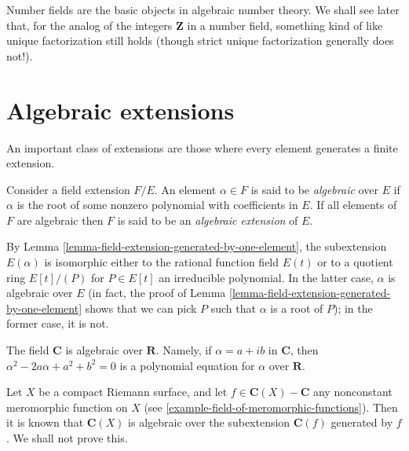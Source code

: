 \noindent
Number fields are the basic objects in algebraic number theory. We shall see
later that,
for the analog of the integers $\mathbf{Z}$ in a number field, something kind
of like unique factorization still holds (though strict unique factorization
generally does not!).


\section{Algebraic extensions}
\label{section-algebraic-extensions}

\noindent
An important class of extensions are those where every element generates
a finite extension.

\begin{definition}
\label{definition-algebraic}
Consider a field extension $F/E$. An element $\alpha \in F$ is said to be
{\it algebraic} over $E$ if $\alpha$ is the root of some nonzero polynomial
with coefficients in $E$. If all elements of $F$ are algebraic then $F$ is
said to be an {\it algebraic extension} of $E$.
\end{definition}

\noindent
By Lemma \ref{lemma-field-extension-generated-by-one-element}, the
subextension $E(\alpha)$ is isomorphic either to the rational function
field $E(t)$ or to a quotient ring $E[t]/(P)$ for $P \in E[t]$ an
irreducible polynomial. In the latter case, $\alpha$ is algebraic over
$E$ (in fact, the proof of
Lemma \ref{lemma-field-extension-generated-by-one-element}
shows that we can pick $P$ such that $\alpha$ is a root of $P$);
in the former case, it is not.

\begin{example}
\label{example-C-algebraic-over-R}
The field $\mathbf{C}$ is algebraic over $\mathbf{R}$. Namely, if
$\alpha = a + ib$ in $\mathbf{C}$, then $\alpha^2 - 2a\alpha + a^2 + b^2 = 0$
is a polynomial equation for $\alpha$ over $\mathbf{R}$.
\end{example}

\begin{example}
\label{example-compact-riemann-surface-is-finite-over-P1}
Let $X$ be a compact Riemann surface, and let
$f \in \mathbf{C}(X) - \mathbf{C}$ any nonconstant meromorphic function
on $X$ (see \ref{example-field-of-meromorphic-functions}). Then it is
known that $\mathbf{C}(X)$ is algebraic over the subextension
$\mathbf{C}(f)$ generated by $f$. We shall not prove this.
\end{example}

